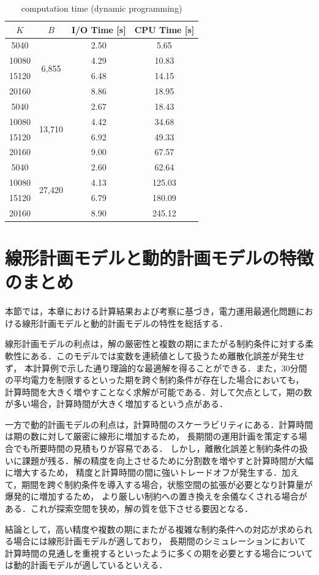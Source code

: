 \begin{table}[htbp]
  \centering
  \caption{computation time (dynamic programming)}
  \label{table:time_dp}
  \begin{tabular}{cccc}
    \hline
    $K$ & $B$ & I/O Time [s] & CPU Time [s] \\
    \hline \hline
    5040  & \multirow{4}{*}{6,855}  & 2.50 & 5.65  \\
    10080 &                         & 4.29 & 10.83 \\
    15120 &                         & 6.48 & 14.15 \\
    20160 &                         & 8.86 & 18.95 \\
    \hline
    5040  & \multirow{4}{*}{13,710} & 2.67 & 18.43 \\
    10080 &                         & 4.42 & 34.68 \\
    15120 &                         & 6.92 & 49.33 \\
    20160 &                         & 9.00 & 67.57 \\
    \hline
    5040  & \multirow{4}{*}{27,420} & 2.60 & 62.64  \\
    10080 &                         & 4.13 & 125.03 \\
    15120 &                         & 6.79 & 180.09 \\
    20160 &                         & 8.90 & 245.12 \\
    \hline
  \end{tabular}
\end{table}

\section{線形計画モデルと動的計画モデルの特徴のまとめ}
本節では，本章における計算結果および考察に基づき，電力運用最適化問題における線形計画モデルと動的計画モデルの特性を総括する．

線形計画モデルの利点は，解の厳密性と複数の期にまたがる制約条件に対する柔軟性にある．このモデルでは変数を連続値として扱うため離散化誤差が発生せず，
本計算例で示した通り理論的な最適解を得ることができる．また，30分間の平均電力を制限するといった期を跨ぐ制約条件が存在した場合においても，
計算時間を大きく増やすことなく求解が可能である．対して欠点として，期の数が多い場合，計算時間が大きく増加するという点がある．

一方で動的計画モデルの利点は，計算時間のスケーラビリティにある．計算時間は期の数に対して厳密に線形に増加するため，
長期間の運用計画を策定する場合でも所要時間の見積もりが容易である．
しかし，離散化誤差と制約条件の扱いに課題が残る．解の精度を向上させるために分割数を増やすと計算時間が大幅に増大するため，
精度と計算時間の間に強いトレードオフが発生する．加えて，期間を跨ぐ制約条件を導入する場合，状態空間の拡張が必要となり計算量が爆発的に増加するため，
より厳しい制約への置き換えを余儀なくされる場合がある．これが探索空間を狭め，解の質を低下させる要因となる．

結論として，高い精度や複数の期にまたがる複雑な制約条件への対応が求められる場合には線形計画モデルが適しており，
長期間のシミュレーションにおいて計算時間の見通しを重視するといったように多くの期を必要とする場合については動的計画モデルが適しているといえる．





